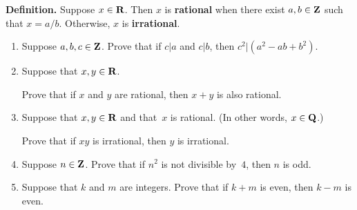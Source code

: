 \documentclass[12pt,letterpaper]{report}
\def\Z{{\bf Z}}
\def\Q{{\bf Q}}
\def\R{{\bf R}}
\begin{document}
\smallskip

\noindent\textbf{Definition.}  Suppose $x\in\R$.  Then $x$ is \textbf{rational} when there exist $a,b\in\Z$
such that $x = a/b$.  Otherwise, $x$ is \textbf{irrational}.

\medskip

\begin{enumerate}

\item  Suppose $a,b,c\in\Z$.  Prove that if $c|a$ and $c|b$, then $c^2|(a^2 - ab + b^2)$.

\item  Suppose that $x,y\in\R$.  

Prove that if $x$ and $y$ are rational, then $x + y$ is also rational.

\item  Suppose that $x,y\in\R$ and that~$x$ is rational.  (In other words, $x\in\Q$.)

Prove that if $xy$ is irrational, then $y$ is irrational.

\item  Suppose $n\in\Z$.
Prove that if $n^2$ is not divisible by~$4$, then $n$ is odd.

\item  Suppose that $k$ and $m$ are integers.  Prove that if $k + m$ is even, then $k - m$ is even.

\end{enumerate}
\end{document}
